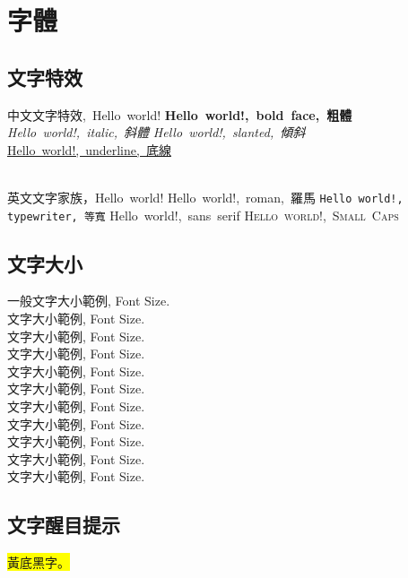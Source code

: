 \clearpage

\section{字體}
\subsection{文字特效}

\hbox{中文文字特效, Hello world!}
{\LARGE
\hbox{\textbf{Hello world!, bold face, 粗體}}
\hbox{\textit{Hello world!, italic, 斜體}}
\hbox{\textsl{Hello world!, slanted, 傾斜}}
\hbox{\underline{Hello world!, underline, 底線}}
}

~\\

\hbox{英文文字家族，Hello world!}
{\LARGE
   \hbox{\textrm{Hello world!, roman, 羅馬}}
   \hbox{\texttt{Hello world!, typewriter, 等寬}}
   \hbox{\textsf{Hello world!, sans serif}}
   \hbox{\textsc{Hello world!, Small Caps}}
}
\clearpage

\subsection{文字大小}
一般文字大小範例, Font Size. \\
{\tiny 文字大小範例, Font Size.} \\
{\scriptsize 文字大小範例, Font Size.} \\
{\footnotesize 文字大小範例, Font Size.} \\
{\small 文字大小範例, Font Size.} \\
{\normalsize 文字大小範例, Font Size.} \\
{\large 文字大小範例, Font Size.} \\
{\Large 文字大小範例, Font Size.} \\
{\LARGE 文字大小範例, Font Size.} \\
{\huge 文字大小範例, Font Size.} \\
{\Huge 文字大小範例, Font Size.}
\clearpage

\subsection{文字醒目提示}

\hbox{\colorbox{yellow}{黃底黑字。}}
\hbox{\color{blue}{藍色文字}}
\hbox{}
\hbox{\color{black}{最後請記得回復成預設黑色字體}}

